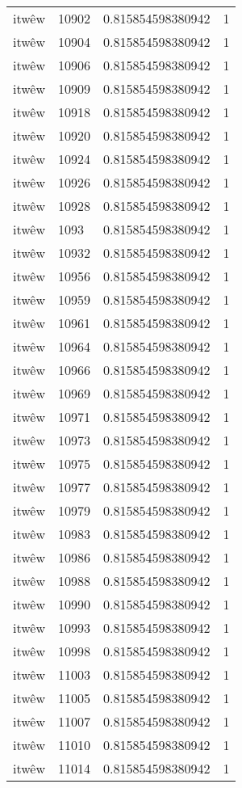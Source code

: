 \begin{longtable}{llll}
itwêw & 10902 & 0.815854598380942 & 1 \\
itwêw & 10904 & 0.815854598380942 & 1 \\
itwêw & 10906 & 0.815854598380942 & 1 \\
itwêw & 10909 & 0.815854598380942 & 1 \\
itwêw & 10918 & 0.815854598380942 & 1 \\
itwêw & 10920 & 0.815854598380942 & 1 \\
itwêw & 10924 & 0.815854598380942 & 1 \\
itwêw & 10926 & 0.815854598380942 & 1 \\
itwêw & 10928 & 0.815854598380942 & 1 \\
itwêw & 1093 & 0.815854598380942 & 1 \\
itwêw & 10932 & 0.815854598380942 & 1 \\
itwêw & 10956 & 0.815854598380942 & 1 \\
itwêw & 10959 & 0.815854598380942 & 1 \\
itwêw & 10961 & 0.815854598380942 & 1 \\
itwêw & 10964 & 0.815854598380942 & 1 \\
itwêw & 10966 & 0.815854598380942 & 1 \\
itwêw & 10969 & 0.815854598380942 & 1 \\
itwêw & 10971 & 0.815854598380942 & 1 \\
itwêw & 10973 & 0.815854598380942 & 1 \\
itwêw & 10975 & 0.815854598380942 & 1 \\
itwêw & 10977 & 0.815854598380942 & 1 \\
itwêw & 10979 & 0.815854598380942 & 1 \\
itwêw & 10983 & 0.815854598380942 & 1 \\
itwêw & 10986 & 0.815854598380942 & 1 \\
itwêw & 10988 & 0.815854598380942 & 1 \\
itwêw & 10990 & 0.815854598380942 & 1 \\
itwêw & 10993 & 0.815854598380942 & 1 \\
itwêw & 10998 & 0.815854598380942 & 1 \\
itwêw & 11003 & 0.815854598380942 & 1 \\
itwêw & 11005 & 0.815854598380942 & 1 \\
itwêw & 11007 & 0.815854598380942 & 1 \\
itwêw & 11010 & 0.815854598380942 & 1 \\
itwêw & 11014 & 0.815854598380942 & 1 \\

\end{longtable}
